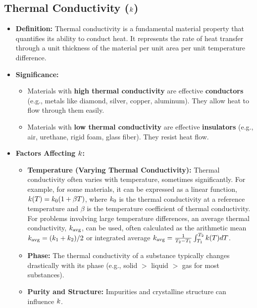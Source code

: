 \subsection{Thermal Conductivity ($k$)}
\begin{itemize}
    \item \textbf{Definition:} Thermal conductivity is a fundamental material property that quantifies its ability to conduct heat. It represents the rate of heat transfer through a unit thickness of the material per unit area per unit temperature difference.
    \item \textbf{Significance:}
        \begin{itemize}
            \item Materials with \textbf{high thermal conductivity} are effective \textbf{conductors} (e.g., metals like diamond, silver, copper, aluminum). They allow heat to flow through them easily.
            \item Materials with \textbf{low thermal conductivity} are effective \textbf{insulators} (e.g., air, urethane, rigid foam, glass fiber). They resist heat flow.
        \end{itemize}
    \item \textbf{Factors Affecting $k$:}
        \begin{itemize}
            \item \textbf{Temperature (Varying Thermal Conductivity):} Thermal conductivity often varies with temperature, sometimes significantly. For example, for some materials, it can be expressed as a linear function, $k(T) = k_0 (1 + \beta T)$, where $k_0$ is the thermal conductivity at a reference temperature and $\beta$ is the temperature coefficient of thermal conductivity. For problems involving large temperature differences, an average thermal conductivity, $k_{\text{avg}}$, can be used, often calculated as the arithmetic mean $k_{\text{avg}} = (k_1 + k_2)/2$ or integrated average $k_{\text{avg}} = \frac{1}{T_2-T_1} \int_{T_1}^{T_2} k(T) dT$.
            \item \textbf{Phase:} The thermal conductivity of a substance typically changes drastically with its phase (e.g., solid $>$ liquid $>$ gas for most substances).
            \item \textbf{Purity and Structure:} Impurities and crystalline structure can influence $k$.
        \end{itemize}
\end{itemize}

